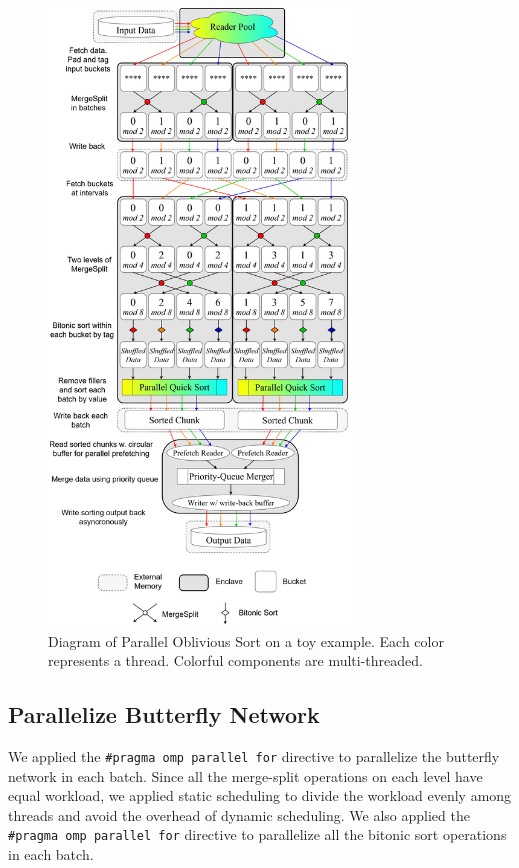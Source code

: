 \documentclass{article}
\begin{document}
\begin{figure}[htbp]
    \centering
    \includegraphics[width=0.72\textwidth]{assets/parosort.png}
    \caption{Diagram of Parallel Oblivious Sort on a toy example. Each color represents a thread. Colorful components are multi-threaded.}
    \label{fig:parosort}
  \end{figure}

\subsection{Parallelize Butterfly Network}
We applied the {\tt \#pragma omp parallel for} directive to parallelize the butterfly network in each batch. Since all the merge-split operations on each level have equal workload, we applied static scheduling to divide the workload evenly among threads and avoid the overhead of dynamic scheduling. We also applied the {\tt \#pragma omp parallel for} directive to parallelize all the bitonic sort operations in each batch.
\end{document}

